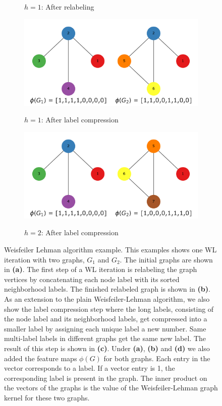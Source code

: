 \begin{figure}[htb!]
\begin{subfigure}[t]{0.49\linewidth}
  \caption{$h=1$: After relabeling}
  \end{subfigure}
  \begin{subfigure}[t]{0.49\linewidth}
  {\includegraphics[width=\linewidth]{assets/figures/wl_examples/wl_iteration_1_stage_1_compressed.pdf}}
  \caption{$h=1$: After label compression}
  \end{subfigure}
\begin{subfigure}[t]{0.49\linewidth}
{\includegraphics[width=\linewidth]{assets/figures/wl_examples/wl_iteration_2_stage_1_compressed.pdf}}
\caption{$h=2$: After label compression}
\end{subfigure}
	\caption[Example: Weisfeiler Lehman iteration]{Weisfeiler Lehman algorithm example. This examples shows one WL iteration with two graphs, $G_1$ and $G_2$. The initial graphs are shown in \textbf{(a)}. The first step of a WL iteration is relabeling the graph vertices by concatenating each node label with its sorted neighborhood labels. The finished relabeled graph is shown in \textbf{(b)}. As an extension to the plain Weisfeiler-Lehman algorithm, we also show the label compression step where the long labels, consisting of the node label and its neighborhood labels, get compressed into a smaller label by assigning each unique label a new number. Same multi-label labels in different graphs get the same new label. The result of this step is shown in \textbf{(c)}. Under \textbf{(a)},  \textbf{(b)} and \textbf{(d)} we also added the feature maps $\phi(G)$ for both graphs. Each entry in the vector corresponds to a label. If a vector entry is 1, the corresponding label is present in the graph. The inner product on the vectors of the graphs is the value of the Weisfeiler-Lehman graph kernel for these two graphs.
}
\end{figure}

